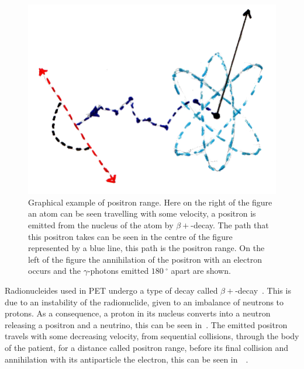                 \begin{figure}
                    \centering
                    
                    \includegraphics[width=1.0\linewidth]{figures/background_positron_range.png}
                    
                    \captionsetup{singlelinecheck=false, justification=raggedright}
                    \caption{Graphical example of positron range. Here on the right of the figure an atom can be seen travelling with some velocity, a positron is emitted from the nucleus of the atom by $\beta+$-decay. The path that this positron takes can be seen in the centre of the figure represented by a blue line, this path is the positron range. On the left of the figure the annihilation of the positron with an electron occurs and the $\gamma$-photons emitted $\SI{180}{^{\circ}}$ apart are shown.} \label{fig:decay_and_annihilation_positron_range}
                \end{figure}
                
                Radionucleides used in \gls{PET} undergo a type of decay called $\beta+$-decay~. This is due to an instability of the radionuclide, given to an imbalance of neutrons to protons. As a consequence, a proton in its nucleus converts into a neutron releasing a positron and a neutrino, this can be seen in~. The emitted positron travels with some decreasing velocity, from sequential collisions, through the body of the patient, for a distance called positron range, before its final collision and annihilation with its antiparticle the electron, this can be seen in~~. %
                
